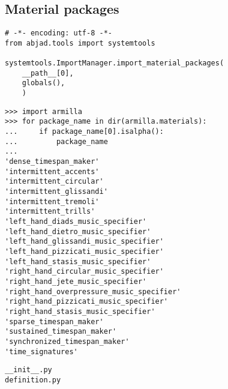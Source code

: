 \subsection{Material packages}

\begin{singlespacing}
\vspace{-0.5\baselineskip}
\begin{lstlisting}
# -*- encoding: utf-8 -*-
from abjad.tools import systemtools

systemtools.ImportManager.import_material_packages(
    __path__[0],
    globals(),
    )
\end{lstlisting}
\end{singlespacing}

\begin{comment}
<abjad>
import armilla
for package_name in dir(armilla.materials):
    if package_name[0].isalpha():
        package_name

</abjad>
\end{comment}

\begin{singlespacing}
\vspace{-0.5\baselineskip}
\begin{lstlisting}
>>> import armilla
>>> for package_name in dir(armilla.materials):
...     if package_name[0].isalpha():
...         package_name
...
'dense_timespan_maker'
'intermittent_accents'
'intermittent_circular'
'intermittent_glissandi'
'intermittent_tremoli'
'intermittent_trills'
'left_hand_diads_music_specifier'
'left_hand_dietro_music_specifier'
'left_hand_glissandi_music_specifier'
'left_hand_pizzicati_music_specifier'
'left_hand_stasis_music_specifier'
'right_hand_circular_music_specifier'
'right_hand_jete_music_specifier'
'right_hand_overpressure_music_specifier'
'right_hand_pizzicati_music_specifier'
'right_hand_stasis_music_specifier'
'sparse_timespan_maker'
'sustained_timespan_maker'
'synchronized_timespan_maker'
'time_signatures'
\end{lstlisting}
\end{singlespacing}

\begin{singlespacing}
\vspace{-0.5\baselineskip}
\begin{lstlisting}
__init__.py
definition.py
\end{lstlisting}
\end{singlespacing}

